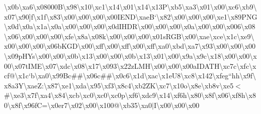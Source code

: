 \textbackslash{}x0b\textbackslash{}xa6\textbackslash{}x08000\+B\textbackslash{}x98\textbackslash{}x10\textbackslash{}xc1\textbackslash{}x14\textbackslash{}x01\textbackslash{}x14\textbackslash{}x13\+P\textbackslash{}xb5\textbackslash{}xa3\textbackslash{}x01\textbackslash{}x00\textbackslash{}xc6\textbackslash{}xb9\textbackslash{}x07\textbackslash{}x90\mbox{]}f\textbackslash{}x1f\textbackslash{}x83\textbackslash{}x00\textbackslash{}x00\textbackslash{}x00\textbackslash{}x00\+I\+E\+N\+D\textbackslash{}xae\+B`\textbackslash{}x82\textbackslash{}x00\textbackslash{}x00\textbackslash{}x00\textbackslash{}xe1\textbackslash{}x89\+P\+N\+G\textbackslash{}x0d\textbackslash{}x0a\textbackslash{}x1a\textbackslash{}x0a\textbackslash{}x00\textbackslash{}x00\textbackslash{}x00\textbackslash{}x0d\+I\+H\+D\+R\textbackslash{}x00\textbackslash{}x00\textbackslash{}x00\textbackslash{}x0a\textbackslash{}x00\textbackslash{}x00\textbackslash{}x006\textbackslash{}x08\textbackslash{}x06\textbackslash{}x00\textbackslash{}x00\textbackslash{}x00\textbackslash{}xfe\textbackslash{}x8a\textbackslash{}x08k\textbackslash{}x00\textbackslash{}x00\textbackslash{}x00\textbackslash{}x01s\+R\+G\+B\textbackslash{}x00\textbackslash{}xae\textbackslash{}xce\textbackslash{}x1c\textbackslash{}xe9\textbackslash{}x00\textbackslash{}x00\textbackslash{}x00\textbackslash{}x06b\+K\+G\+D\textbackslash{}x00\textbackslash{}xff\textbackslash{}x00\textbackslash{}xff\textbackslash{}x00\textbackslash{}xff\textbackslash{}xa0\textbackslash{}xbd\textbackslash{}xa7\textbackslash{}x93\textbackslash{}x00\textbackslash{}x00\textbackslash{}x00\textbackslash{}x09p\+H\+Ys\textbackslash{}x00\textbackslash{}x00\textbackslash{}x0b\textbackslash{}x13\textbackslash{}x00\textbackslash{}x00\textbackslash{}x0b\textbackslash{}x13\textbackslash{}x01\textbackslash{}x00\textbackslash{}x9a\textbackslash{}x9c\textbackslash{}x18\textbackslash{}x00\textbackslash{}x00\textbackslash{}x00\textbackslash{}x07t\+I\+M\+E\textbackslash{}x07\textbackslash{}xdc\textbackslash{}x08\textbackslash{}x17\textbackslash{}x093\textbackslash{}x22z\+L\+M\+H\textbackslash{}x00\textbackslash{}x00\textbackslash{}x00a\+I\+D\+A\+T\+H\textbackslash{}xc7c\textbackslash{}xfc\textbackslash{}xcf@\textbackslash{}x1c`b\textbackslash{}xa0\textbackslash{}x99\+Bc\#\#\textbackslash{}x06c\#\#\textbackslash{}x0c6\textbackslash{}x1d\textbackslash{}xac\textbackslash{}x1e\+U8\textbackslash{}xc8\textbackslash{}x142\textbackslash{}xfeg``hh\textbackslash{}x9f\textbackslash{}x8a3\+Y\textbackslash{}xae\+Z\+:\textbackslash{}x87\textbackslash{}xe1\textbackslash{}xda\textbackslash{}x95\textbackslash{}xf3\textbackslash{}x8c4\textbackslash{}xb2\+Z\+K\textbackslash{}xc7\textbackslash{}x10o\textbackslash{}x8e\textbackslash{}xb8v\textbackslash{}xe5$<$\#\textbackslash{}xe3\textbackslash{}x7f\textbackslash{}xa4\textbackslash{}x84\textbackslash{}xcb\textbackslash{}xc0\textbackslash{}xc0\textbackslash{}xc0p\textbackslash{}xf6\textbackslash{}xdc9\textbackslash{}x14\textbackslash{}xf6h\textbackslash{}x80\textbackslash{}x8f\textbackslash{}x06\textbackslash{}xf8h\textbackslash{}x80\textbackslash{}x8f\textbackslash{}x96f\+C\textquotesingle{}=\textbackslash{}x0er7\textbackslash{}x02\textbackslash{}x00\textbackslash{}x100@\textbackslash{}xb35\textbackslash{}xa0$\vert$\+I\textbackslash{}x00\textbackslash{}x00\textbackslash{}x00\tex